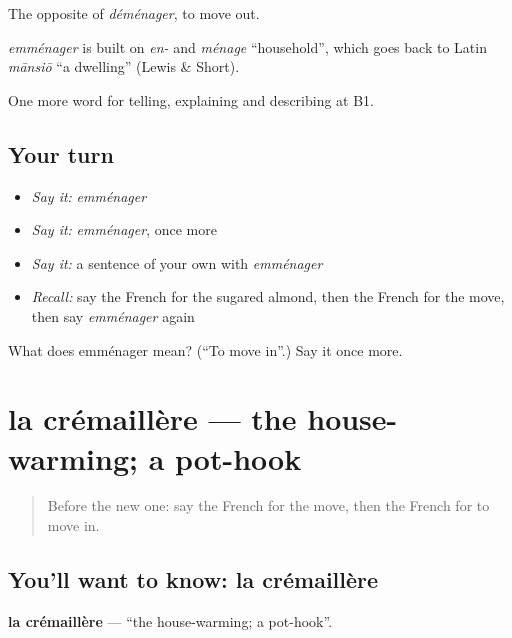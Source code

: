 The opposite of \emph{déménager}, to move out.

\begin{cousinweb}
\emph{emménager} is built on \emph{en-} and \emph{ménage} \textquotedblleft{}household\textquotedblright{}, which goes back to Latin \emph{mānsiō} \textquotedblleft{}a dwelling\textquotedblright{} (Lewis \& Short).
\end{cousinweb}

\begin{grammarlens}[title={What you've built}]
One more word for telling, explaining and describing at B1.
\end{grammarlens}

\subsection*{Your turn}
\begin{itemize}
\raggedright
  \item \emph{Say it:} \emph{emménager}
  \item \emph{Say it:} \emph{emménager}, once more
  \item \emph{Say it:} a sentence of your own with \emph{emménager}
  \item \emph{Recall:} say the French for the sugared almond, then the French for the move, then say \emph{emménager} again
\end{itemize}

\begin{tcolorbox}[breakable,colback=teal!4,colframe=teal!35!black,title={Before you move on}]
What does emménager mean? (\textquotedblleft{}To move in\textquotedblright{}.) Say it once more.
\end{tcolorbox}
\section[la crémaillère]{la crémaillère — the house-warming; a pot-hook}

\label{lesson:FR-C312-cremaillere}



\begin{quote}
Before the new one: say the French for the move, then the French for to move in.
\end{quote}

\subsection*{You'll want to know: la crémaillère}
\textbf{la crémaillère} — \textquotedblleft{}the house-warming; a pot-hook\textquotedblright{}.

